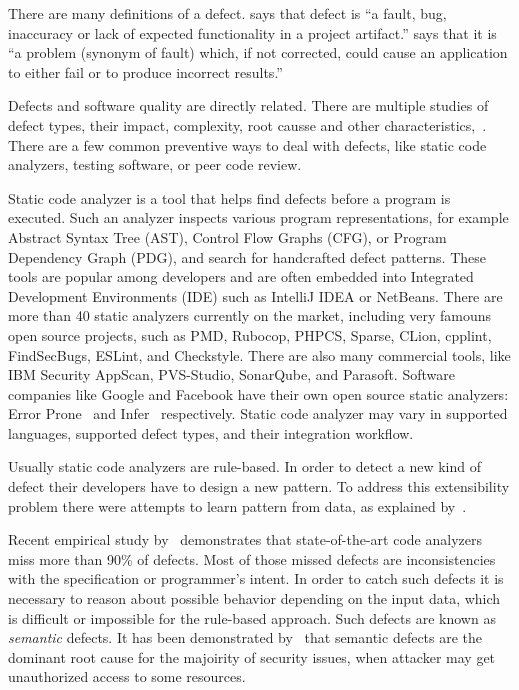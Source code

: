 There are many definitions of a defect.  
\citet{5989519} says that defect is ``a fault, bug, inaccuracy or lack of expected 
functionality in a project artifact.'' 
\citet{Assurance} says that it is ``a problem 
(synonym of fault) which, if not corrected, 
could cause an application to either fail or to produce incorrect results.''

Defects and software quality are directly related. There are multiple studies 
of defect types, their impact, complexity, 
root causse and other characteristics,~\citet[e.g.][]{10.1145/69605.2085, 
10.5555/256664.256773, 10.1145/390016.808455, Glass1981PersistentSE, 
10.1145/1353535.1346323, 10.1007/s10664-013-9258-8, catolino2019bugs}.
There are a few common preventive ways to deal with defects, like 
static code analyzers, testing software, or peer code review. 

Static code analyzer 
is a tool that helps find defects before a program is executed. 
Such an analyzer inspects various program representations, for example 
Abstract Syntax Tree (AST), Control Flow Graphs (CFG), or
Program Dependency Graph (PDG), 
and search for handcrafted defect patterns. 
These tools are popular among developers and are often embedded into
Integrated Development Environments (IDE) such as IntelliJ IDEA or NetBeans. 
There are more than 40 static analyzers currently on the market, including
very famouns open source projects, such as
PMD, Rubocop, PHPCS, Sparse, CLion, cpplint, FindSecBugs, ESLint, and Checkstyle.
There are also many commercial tools, like 
IBM Security AppScan, PVS-Studio, SonarQube, and Parasoft.
Software companies like Google and Facebook have their own open source
static analyzers: Error Prone~\citep{10.1109/SCAM.2012.28} and 
Infer~\citep{10.1007/978-3-319-17524-9_1} respectively. 
Static code analyzer may vary in supported languages, 
supported defect types, and their integration workflow.

Usually static code analyzers are rule-based. 
In order to detect a new kind of defect their developers have to
design a new pattern. To address this extensibility problem 
there were attempts to learn pattern
from data, as explained by~\citet{bielik2016learning, wang2019learning}.

Recent empirical study by~\citet{10.1145/3238147.3238213} demonstrates that 
state-of-the-art code analyzers miss more than 90\% of defects. Most of those missed 
defects are inconsistencies with the specification or programmer's intent. 
In order to catch such defects it is necessary to reason about 
possible behavior depending on the input data, 
which is difficult or impossible for the rule-based approach. 
Such defects are known as \emph{semantic} defects. 
It has been demonstrated by~\citet{10.1007/s10664-013-9258-8} 
that semantic defects are the dominant root cause for the majoirity of security issues, 
when attacker may get unauthorized access to some resources.

